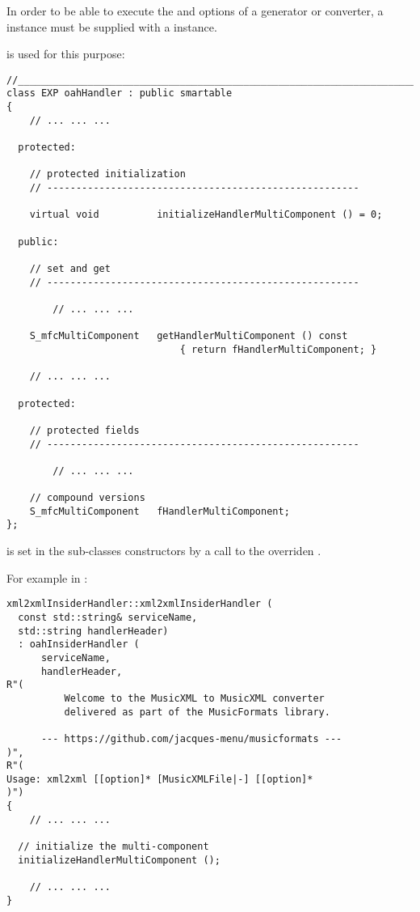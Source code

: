 In order to be able to execute the  and  options of a generator or converter, a  instance must be supplied with a  instance.

 is used for this purpose:
\begin{lstlisting}[language=CPlusPlus]
//_______________________________________________________________________________
class EXP oahHandler : public smartable
{
	// ... ... ...

  protected:

    // protected initialization
    // ------------------------------------------------------

    virtual void          initializeHandlerMultiComponent () = 0;

  public:

    // set and get
    // ------------------------------------------------------

		// ... ... ...

    S_mfcMultiComponent   getHandlerMultiComponent () const
                              { return fHandlerMultiComponent; }

	// ... ... ...

  protected:

    // protected fields
    // ------------------------------------------------------

		// ... ... ...

    // compound versions
    S_mfcMultiComponent   fHandlerMultiComponent;
};
\end{lstlisting}

 is set in the  sub-classes constructors by a call to the overriden .

For example in :
\begin{lstlisting}[language=CPlusPlus]
xml2xmlInsiderHandler::xml2xmlInsiderHandler (
  const std::string& serviceName,
  std::string handlerHeader)
  : oahInsiderHandler (
      serviceName,
      handlerHeader,
R"(
          Welcome to the MusicXML to MusicXML converter
          delivered as part of the MusicFormats library.

      --- https://github.com/jacques-menu/musicformats ---
)",
R"(
Usage: xml2xml [[option]* [MusicXMLFile|-] [[option]*
)")
{
	// ... ... ...

  // initialize the multi-component
  initializeHandlerMultiComponent ();

	// ... ... ...
}
\end{lstlisting}

